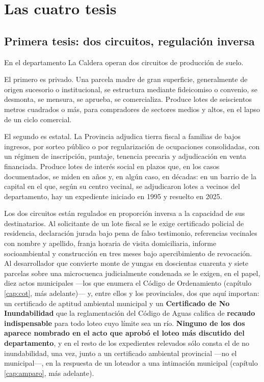 \chapter{Las cuatro tesis}

\label{cap:planteo}
\section{Primera tesis: dos circuitos, regulación inversa}

En el departamento La Caldera operan dos circuitos de producción de suelo.

El primero es privado. Una parcela madre de gran superficie, generalmente de origen sucesorio o institucional, se estructura mediante fideicomiso o convenio, se desmonta, se mensura, se aprueba, se comercializa. Produce lotes de seiscientos metros cuadrados o más, para compradores de sectores medios y altos, en el lapso de un ciclo comercial.

El segundo es estatal. La Provincia adjudica tierra fiscal a familias de bajos ingresos, por sorteo público o por regularización de ocupaciones consolidadas, con un régimen de inscripción, puntaje, tenencia precaria y adjudicación en venta financiada. Produce lotes de interés social en plazos que, en los casos documentados, se miden en años y, en algún caso, en décadas: en un barrio de la capital en el que, según su centro vecinal, se adjudicaron lotes a vecinos del departamento, hay un expediente iniciado en 1995 y resuelto en 2025.

Los dos circuitos están regulados en proporción inversa a la capacidad de sus destinatarios. Al solicitante de un lote fiscal se le exige certificado policial de residencia, declaración jurada bajo pena de falso testimonio, referencias vecinales con nombre y apellido, franja horaria de visita domiciliaria, informe socioambiental y construcción en tres meses bajo apercibimiento de revocación. Al desarrollador que convierte monte de yungas en doscientas cuarenta y siete parcelas sobre una microcuenca judicialmente condenada se le exigen, en el papel, diez actos municipales ---los que enumera el Código de Ordenamiento (capítulo \ref{cap:cot}, más adelante)--- y, entre ellos y los provinciales, dos que aquí importan: un certificado de aptitud ambiental municipal y un \textbf{Certificado de No Inundabilidad} que la reglamentación del Código de Aguas califica de \textbf{recaudo indispensable} para todo loteo cuyo límite sea un río. \textbf{Ninguno de los dos aparece nombrado en el acto que aprobó el loteo más discutido del departamento}, y en el resto de los expedientes relevados sólo consta el de no inundabilidad, una vez, junto a un certificado ambiental provincial ---no el municipal---, en la respuesta de un loteador a una intimación municipal (capítulo \ref{cap:amparo}, más adelante).


